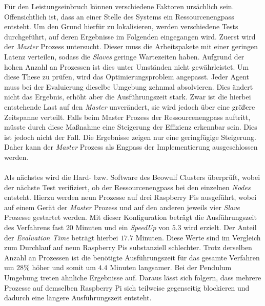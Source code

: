 Für den Leistungseinbruch können verschiedene Faktoren ursächlich sein. Offensichtlich ist, dass an einer Stelle des Systems ein Ressourcenengpass entsteht. Um den Grund hierfür zu lokalisieren, werden verschiedene Tests durchgeführt, auf deren Ergebnisse im Folgenden eingegangen wird. Zuerst wird der \emph{Master} Prozess untersucht. Dieser muss die Arbeitspakete mit einer geringen Latenz verteilen, sodass die \emph{Slaves} geringe Wartezeiten haben. Aufgrund der hohen Anzahl an Prozessen ist dies unter Umständen nicht gewährleistet. Um diese These zu prüfen, wird das Optimierungsproblem angepasst. Jeder Agent muss bei der Evaluierung dieselbe Umgebung zehnmal absolvieren. Dies ändert nicht das Ergebnis, erhöht aber die Ausführungszeit stark. Zwar ist die hierbei entstehende Last auf den \emph{Master} unverändert, sie wird jedoch über eine größere Zeitspanne verteilt. Falls beim Master Prozess der Ressourcenengpass auftritt, müsste durch diese Maßnahme eine Steigerung der Effizienz erkennbar sein. Dies ist jedoch nicht der Fall. Die Ergebnisse zeigen nur eine geringfügige Steigerung. Daher kann der \emph{Master} Prozess als Engpass der Implementierung ausgeschlossen werden. 
\\\\
Als nächstes wird die Hard- bzw. Software des Beowulf Clusters überprüft, wobei der nächste Test verifiziert, ob der Ressourcenengpass bei den einzelnen \emph{Nodes} entsteht. Hierzu werden neun Prozesse auf drei Raspberry Pis ausgeführt, wobei auf einem Gerät der \emph{Master} Prozess und auf den anderen jeweils vier \emph{Slave} Prozesse gestartet werden. Mit dieser Konfiguration beträgt die Ausführungszeit des Verfahrens fast $20$ Minuten und ein \emph{SpeedUp} von $5.3$ wird erzielt. Der Anteil der \emph{Evaluation Time} beträgt hierbei $17.7$ Minuten. Diese Werte sind im Vergleich zum Durchlauf auf neun Raspberry Pis substanziell schlechter. Trotz derselben Anzahl an Prozessen ist die benötigte Ausführungszeit für das gesamte Verfahren um $28\%$ höher und somit um $4.4$ Minuten langsamer. Bei der Pendulum Umgebung treten ähnliche Ergebnisse auf. Daraus lässt sich folgern, dass mehrere Prozesse auf demselben Raspberry Pi sich teilweise gegenseitig blockieren und dadurch eine längere Ausführungszeit entsteht. 
\\\\
